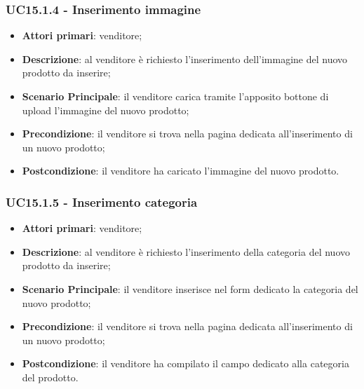 \subsubsection{UC15.1.4 - Inserimento immagine}
\begin{itemize}
\item \textbf{Attori primari}: venditore;
\item \textbf{Descrizione}: al venditore è richiesto l'inserimento dell'immagine del nuovo prodotto da inserire;
\item \textbf{Scenario Principale}: il venditore carica tramite l'apposito bottone di upload l'immagine del nuovo prodotto;
\item \textbf{Precondizione}: il venditore si trova nella pagina dedicata all'inserimento di un nuovo prodotto;
\item \textbf{Postcondizione}: il venditore ha caricato l'immagine del nuovo prodotto.
\end{itemize}

\subsubsection{UC15.1.5 - Inserimento categoria}
\begin{itemize}
\item \textbf{Attori primari}: venditore;
\item \textbf{Descrizione}: al venditore è richiesto l'inserimento della categoria del nuovo prodotto da inserire;
\item \textbf{Scenario Principale}: il venditore inserisce nel form dedicato la categoria del nuovo prodotto;
\item \textbf{Precondizione}: il venditore si trova nella pagina dedicata all'inserimento di un nuovo prodotto;
\item \textbf{Postcondizione}: il venditore ha compilato il campo dedicato alla categoria del prodotto.
\end{itemize}

